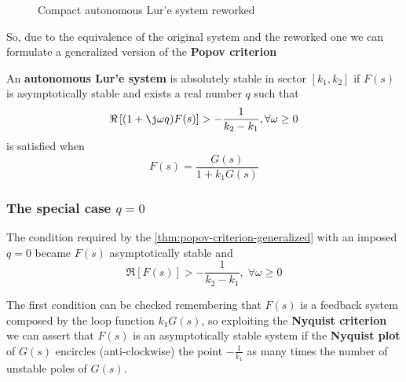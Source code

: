 \begin{figure}[htb]
    \centering
    \caption{Compact autonomous Lur'e system reworked}
    \label{fig:lure-system-reqworked-compact}
\end{figure}

So, due to the equivalence of the original system and the reworked one we can formulate a generalized version of the \textbf{Popov criterion}

\begin{theorem}\label{thm:popov-criterion-generalized}
    An \textbf{autonomous Lur'e system} is absolutely stable in sector $[k_1,k_2]$ if $F(s)$ is asymptotically stable and exists a real number $q$ such that
\[
    \Re \left[(1+\j \omega q) F(s)\right] > - \frac{1}{k_2-k_1}, \forall \omega \geq 0
\]
is satisfied when
\[
    F(s) = \frac{G(s)}{1+k_1 G(s)}
\]
\end{theorem}

\subsubsection{The special case $q=0$}

The condition required by the \cref{thm:popov-criterion-generalized} with an imposed $q=0$ became $F(s)$ asymptotically stable and
\[
    \Re \left[F(s)\right] > - \frac{1}{k_2-k_1}, \; \forall \omega \geq 0
\]

The first condition can be checked remembering that $F(s)$ is a feedback system composed by the loop function $k_1 G(s)$, so exploiting the \textbf{Nyquist criterion} we can assert that $F(s)$ is an asymptotically stable system if the \textbf{Nyquist plot} of $G(s)$ encircles (anti-clockwise) the point $-\frac{1}{k_1}$ as many times the number of unstable poles of $G(s)$.

